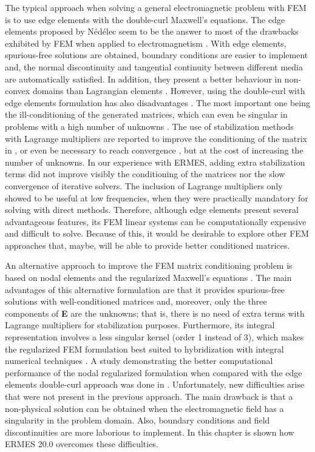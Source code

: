 The typical approach when solving a general electromagnetic problem with FEM is to use edge elements with the double-curl Maxwell's equations. The edge elements proposed by N\'{e}d\'{e}lec \cite{Nedelec} seem to be the answer to most of the drawbacks exhibited by FEM when applied to electromagnetism \cite{Jin, LuisGarcia}. With edge elements, spurious-free solutions are obtained, boundary conditions are easier to implement and, the normal discontinuity and tangential continuity between different media are automatically satisfied. In addition, they present a better behaviour in non-convex domains than Lagrangian elements \cite{EdgeElementsPuntiagudo}. However, using the double-curl with edge elements formulation has also disadvantages \cite{EdgeElementsFallacy, EdgeElementsProsNo}. The most important one being the ill-conditioning of the generated matrices, which can even be singular in problems with a high number of unknowns \cite{SingularEE}. The use of stabilization methods with Lagrange multipliers are reported to improve the conditioning of the matrix in \cite{AugmentedFormulations, HiptmairReport}, or even be necessary to reach convergence \cite{Kikuchi, Ledger-hp}, but at the cost of increasing the number of unknowns. In our experience with ERMES, adding extra stabilization terms did not improve visibly the conditioning of the matrices nor the slow convergence of iterative solvers. The inclusion of Lagrange multipliers only showed to be useful at low frequencies, when they were practically mandatory for solving with direct methods. Therefore, although edge elements present several advantageous features, its FEM linear systems can be computationally expensive and difficult to solve. Because of this, it would be desirable to explore other FEM approaches that, maybe, will be able to provide better conditioned matrices.

An alternative approach to improve the FEM matrix conditioning problem is based on nodal elements and the regularized Maxwell's equations \cite{BC-OJOOut, WeightedRegularizedME}. The main advantages of this alternative formulation are that it provides spurious-free solutions with well-conditioned matrices and, moreover, only the three components of \textbf{E} are the unknowns; that is, there is no need of extra terms with Lagrange multipliers for stabilization purposes. Furthermore, its integral representation involves a less singular kernel (order 1 instead of 3), which makes the regularized FEM formulation best suited to hybridization with integral numerical techniques \cite{BC-OJOOut}. A study demonstrating the better computational performance of the nodal regularized formulation when compared with the edge elements double-curl approach was done in \cite{WRME-Performance}. Unfortunately, new difficulties arise that were not present in the previous approach. The main drawback is that a non-physical solution can be obtained when the electromagnetic field has a singularity in the problem domain. Also, boundary conditions and field discontinuities are more laborious to implement. In this chapter is shown how ERMES 20.0 overcomes these difficulties.

